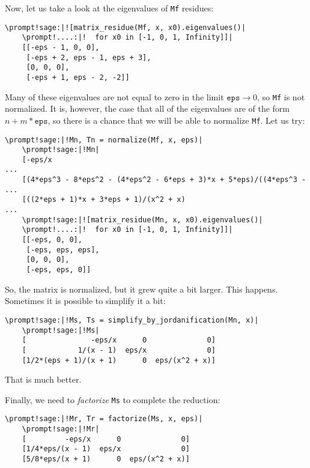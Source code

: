 \documentclass{elsarticle}
\newcommand{\code}[1]{\texttt{#1}}
\newcommand{\prompt}[2]{\textcolor{prompt}{#1} \textcolor{command}{#2}}
\begin{document}
Now, let us take a look at the eigenvalues of \code{Mf} residues:

\begin{Verbatim}[commandchars=\\!|]
    \prompt!sage:|![matrix_residue(Mf, x, x0).eigenvalues()|
    \prompt!....:|!  for x0 in [-1, 0, 1, Infinity]]|
    [[-eps - 1, 0, 0],
     [-eps + 2, eps - 1, eps + 3],
     [0, 0, 0],
     [-eps + 1, eps - 2, -2]]
\end{Verbatim}

Many of these eigenvalues are not equal to zero in the limit $\code{eps}\to0$, so \code{Mf} is not normalized.
It is, however, the case that all of the eigenvalues are of the form $n + m*\code{eps}$, so there is a chance that we will be able to normalize \code{Mf}.
Let us try:

\begin{Verbatim}[commandchars=\\!|]
    \prompt!sage:|!Mn, Tn = normalize(Mf, x, eps)|
    \prompt!sage:|!Mn|
    [-eps/x                                                            ...
    [(4*eps^3 - 8*eps^2 - (4*eps^2 - 6*eps + 3)*x + 5*eps)/((4*eps^3 - ...
    [((2*eps + 1)*x + 3*eps + 1)/(x^2 + x)                             ...
    \prompt!sage:|![matrix_residue(Mn, x, x0).eigenvalues()|
    \prompt!....:|!  for x0 in [-1, 0, 1, Infinity]]|
    [[-eps, 0, 0],
     [-eps, eps, eps],
     [0, 0, 0],
     [-eps, eps, 0]]
\end{Verbatim}

So, the matrix is normalized, but it grew quite a bit larger.
This happens.
Sometimes it is possible to simplify it a bit:

\begin{Verbatim}[commandchars=\\!|]
    \prompt!sage:|!Ms, Ts = simplify_by_jordanification(Mn, x)|
    \prompt!sage:|!Ms|
    [               -eps/x      0              0]
    [            1/(x - 1)  eps/x              0]
    [1/2*(eps + 1)/(x + 1)      0  eps/(x^2 + x)]
\end{Verbatim}

That is much better.

Finally, we need to \textit{factorize} \code{Ms} to complete the reduction:

\begin{Verbatim}[commandchars=\\!|]
    \prompt!sage:|!Mr, Tr = factorize(Ms, x, eps)|
    \prompt!sage:|!Mr|
    [         -eps/x      0              0]
    [1/4*eps/(x - 1)  eps/x              0]
    [5/8*eps/(x + 1)      0  eps/(x^2 + x)]
\end{Verbatim}
\end{document}
